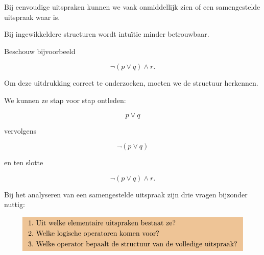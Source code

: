 \documentclass{ximera}
\begin{document}

  Bij eenvoudige uitspraken kunnen we vaak onmiddellijk zien of een
  samengestelde uitspraak waar is.

  Bij ingewikkeldere structuren wordt intuïtie minder betrouwbaar.


  Beschouw bijvoorbeeld

  \[
  \neg(p\lor q)\land r.
  \]

  Om deze uitdrukking correct te onderzoeken, moeten we de structuur
  herkennen.

  We kunnen ze stap voor stap ontleden:

  \[
  p\lor q
  \]

  vervolgens

  \[
  \neg(p\lor q)
  \]

  en ten slotte

  \[
  \neg(p\lor q)\land r.
  \]


  \begin{opmerking}
  Bij het analyseren van een samengestelde uitspraak zijn drie vragen
  bijzonder nuttig:

  \[
  \important{
  \begin{array}{l}
  1.\ \text{Uit welke elementaire uitspraken bestaat ze?}\\[1mm]
  2.\ \text{Welke logische operatoren komen voor?}\\[1mm]
  3.\ \text{Welke operator bepaalt de structuur van de volledige uitspraak?}
  \end{array}
  }
  \]
  \end{opmerking}
\end{document}
